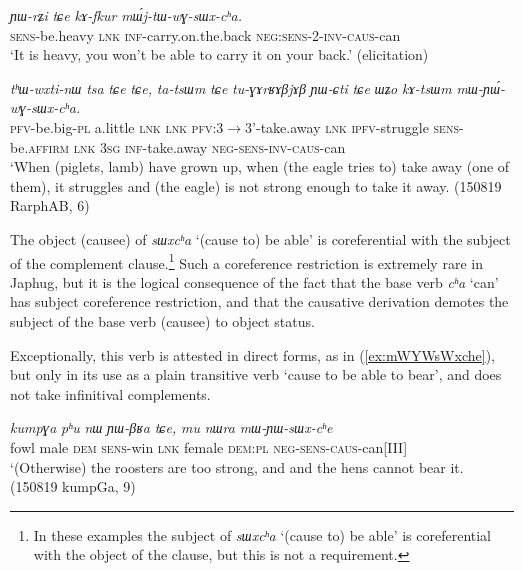 \documentclass[oneside,a4paper,11pt]{article}
\newcommand{\ipa}[1]{\textit{\phon#1}}
\newcommand{\jpg}[2]{\ipa{#1} `#2'}
\newcommand{\refb}[1]{(\ref{#1})}
\begin{document}
\begin{exe}
\ex \label{ex:mWjtWwGsWxcha}
\gll \ipa{ɲɯ-rʑi} 	\ipa{tɕe} 	\ipa{kɤ-fkur}  	\ipa{mɯ́j-tɯ-wɣ-sɯx-cʰa.} \\
\textsc{sens}-be.heavy \textsc{lnk}  \textsc{inf}-carry.on.the.back \textsc{neg:sens-2-inv-caus}-can \\
\glt `It is heavy, you won't be able to carry it on your back.' (elicitation)
\end{exe}	

  
\begin{exe}
\ex \label{ex:mWYWwGsWxcha}
\gll \ipa{tʰɯ-wxti-nɯ} 	\ipa{tsa} 	\ipa{tɕe} 	\ipa{tɕe,} 	\ipa{ta-tsɯm} 	\ipa{tɕe} 	\ipa{tu-ɣɤrʁɤβjɤβ} 	\ipa{ɲɯ-ɕti} 	\ipa{tɕe} 	\ipa{ɯʑo} 	\ipa{kɤ-tsɯm} 	\ipa{mɯ-ɲɯ́-wɣ-sɯx-cʰa.} \\
\textsc{pfv}-be.big-\textsc{pl} a.little \textsc{lnk}  \textsc{lnk} \textsc{pfv}:3$\rightarrow$3'-take.away \textsc{lnk} \textsc{ipfv}-struggle \textsc{sens}-be.\textsc{affirm}   \textsc{lnk} \textsc{3sg} \textsc{inf}-take.away \textsc{neg-sens-inv-caus}-can \\
\glt `When (piglets, lamb) have grown up, when (the eagle tries to) take away (one of them), it struggles and (the eagle) is not strong enough to take it away. (150819 RarphAB, 6)
\end{exe}	

The object (causee) of \jpg{sɯxcʰa}{(cause to) be able}  is coreferential with the subject of the complement clause.\footnote{In these examples the subject of \jpg{sɯxcʰa}{(cause to) be able} is coreferential with the object of the clause, but this is not a requirement.} Such a coreference restriction is extremely rare in Japhug, but it is the logical consequence of the fact that the base verb \jpg{cʰa}{can} has subject coreference restriction, and that the causative derivation demotes the subject of the base verb (causee) to object status.

Exceptionally, this verb is attested in direct forms, as in \refb{ex:mWYWsWxche}, but only in its use as a plain transitive verb `cause to be able to bear', and does not take infinitival complements.

\begin{exe}
\ex \label{ex:mWYWsWxche}
\gll 
\ipa{kumpɣa} 	\ipa{pʰu} 	\ipa{nɯ} 	\ipa{ɲɯ-βʁa} 	\ipa{tɕe,} 	\ipa{mu} 	\ipa{nɯra} 	\ipa{mɯ-ɲɯ-sɯx-cʰe} \\
fowl male \textsc{dem} \textsc{sens}-win \textsc{lnk} female \textsc{dem:pl} \textsc{neg-sens-caus}-can[III] \\
\glt `(Otherwise) the roosters are too strong, and and the hens cannot bear it. (150819 kumpGa, 9)
\end{exe} 
\end{document}
